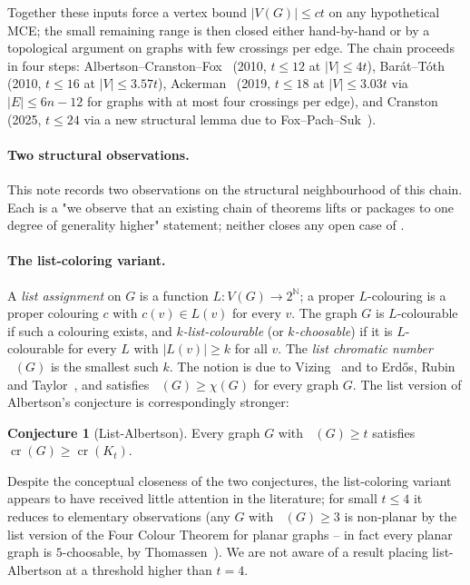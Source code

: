 \documentclass[11pt,a4paper]{article}
\theoremstyle{definition}
\newtheorem{conjecture}[theorem]{Conjecture}
\DeclareMathOperator{\crN}{cr}
\DeclareMathOperator{\chl}{\chi_{\ell}}
\newcommand{\NN}{\mathbb{N}}
\begin{document}
Together these inputs force a vertex bound $|V(G)| \le c t$ on any
hypothetical MCE; the small remaining range is then closed either
hand-by-hand or by a topological argument on graphs with few
crossings per edge. The chain proceeds in four steps:
Albertson--Cranston--Fox~\cite{ACF} (2010, $t \le 12$ at
$|V| \le 4t$), Bar\'at--T\'oth~\cite{BT} (2010, $t \le 16$ at
$|V| \le 3.57t$), Ackerman~\cite{Ackerman} (2019, $t \le 18$ at
$|V| \le 3.03t$ via $|E| \le 6n - 12$ for graphs with at most four
crossings per edge), and Cranston~\cite{Cranston} (2025, $t \le 24$
via a new structural lemma due to Fox--Pach--Suk~\cite{FPS}).

\paragraph{Two structural observations.}
This note records two observations on the structural neighbourhood
of this chain. Each is a "we observe that an existing chain of
theorems lifts or packages to one degree of generality higher"
statement; neither closes any open case of .

\paragraph{The list-coloring variant.}
A \emph{list assignment} on $G$ is a function $L : V(G) \to 2^{\NN}$;
a proper $L$-colouring is a proper colouring $c$ with $c(v) \in L(v)$
for every $v$. The graph $G$ is $L$-colourable if such a colouring
exists, and \emph{$k$-list-colourable} (or \emph{$k$-choosable}) if
it is $L$-colourable for every $L$ with $|L(v)| \ge k$ for all $v$.
The \emph{list chromatic number} $\chl(G)$ is the smallest such $k$.
The notion is due to Vizing~\cite{Vizing} and to Erd\H{o}s, Rubin
and Taylor~\cite{ERT}, and satisfies $\chl(G) \ge \chi(G)$ for every
graph $G$. The list version of Albertson's conjecture is
correspondingly stronger:

\begin{conjecture}[List-Albertson]\label{conj:list-albertson}
Every graph $G$ with $\chl(G) \ge t$ satisfies
$\crN(G) \ge \crN(K_t)$.
\end{conjecture}

Despite the conceptual closeness of the two conjectures, the
list-coloring variant appears to have received little attention in
the literature; for small $t \le 4$ it reduces to elementary
observations (any $G$ with $\chl(G) \ge 3$ is non-planar by the
list version of the Four Colour Theorem for planar graphs --
in fact every planar graph is $5$-choosable, by
Thomassen~\cite{Thomassen}). We are not aware of a result placing
list-Albertson at a threshold higher than $t = 4$.
\end{document}
